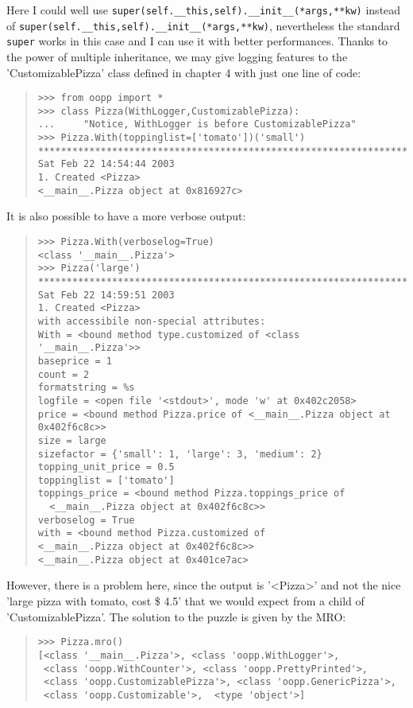 \documentclass[10pt,english]{article}
\begin{document}
Here I could well use \texttt{super(self.{\_}{\_}this,self).{\_}{\_}init{\_}{\_}(*args,**kw)} 
instead of \texttt{super(self.{\_}{\_}this,self).{\_}{\_}init{\_}{\_}(*args,**kw)}, nevertheless 
the standard \texttt{super} works in this case and I can use it with better 
performances.
Thanks to the power of multiple inheritance, we may give logging features
to the 'CustomizablePizza' class defined in chapter 4 
with just one line of code:
\begin{quote}
\begin{verbatim}>>> from oopp import *
>>> class Pizza(WithLogger,CustomizablePizza):
...     "Notice, WithLogger is before CustomizablePizza"
>>> Pizza.With(toppinglist=['tomato'])('small')
****************************************************************************
Sat Feb 22 14:54:44 2003
1. Created <Pizza>
<__main__.Pizza object at 0x816927c>\end{verbatim}
\end{quote}

It is also possible to have a more verbose output:
\begin{quote}
\begin{verbatim}>>> Pizza.With(verboselog=True)
<class '__main__.Pizza'>
>>> Pizza('large')
****************************************************************************
Sat Feb 22 14:59:51 2003
1. Created <Pizza>
with accessibile non-special attributes: 
With = <bound method type.customized of <class '__main__.Pizza'>>
baseprice = 1
count = 2
formatstring = %s
logfile = <open file '<stdout>', mode 'w' at 0x402c2058>
price = <bound method Pizza.price of <__main__.Pizza object at 0x402f6c8c>>
size = large
sizefactor = {'small': 1, 'large': 3, 'medium': 2}
topping_unit_price = 0.5
toppinglist = ['tomato']
toppings_price = <bound method Pizza.toppings_price of 
  <__main__.Pizza object at 0x402f6c8c>>
verboselog = True
with = <bound method Pizza.customized of 
<__main__.Pizza object at 0x402f6c8c>>
<__main__.Pizza object at 0x401ce7ac>\end{verbatim}
\end{quote}

However, there is a problem here, since the output is '{\textless}Pizza{\textgreater}' and
not the nice 'large pizza with tomato, cost {\$} 4.5' that we would
expect from a child of 'CustomizablePizza'. The solution to the
puzzle is given by the MRO:
\begin{quote}
\begin{verbatim}>>> Pizza.mro()
[<class '__main__.Pizza'>, <class 'oopp.WithLogger'>, 
 <class 'oopp.WithCounter'>, <class 'oopp.PrettyPrinted'>,
 <class 'oopp.CustomizablePizza'>, <class 'oopp.GenericPizza'>, 
 <class 'oopp.Customizable'>,  <type 'object'>]\end{verbatim}
\end{quote}
\end{document}

